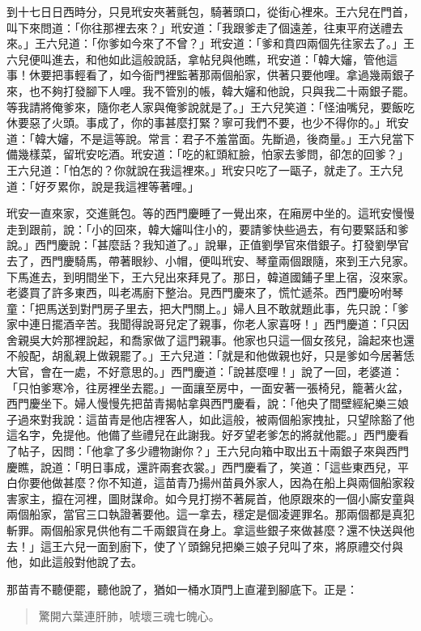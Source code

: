 到十七日日西時分，只見玳安夾著氈包，騎著頭口，從街心裡來。王六兒在門首，叫下來問道：「你往那裡去來？」玳安道：「我跟爹走了個遠差，往東平府送禮去來。」王六兒道：「你爹如今來了不曾？」玳安道：「爹和賁四兩個先往家去了。」王六兒便叫進去，和他如此這般說話，拿帖兒與他瞧，玳安道：「韓大嬸，管他這事！休要把事輕看了，如今衙門裡監著那兩個船家，供著只要他哩。拿過幾兩銀子來，也不夠打發腳下人哩。我不管別的帳，韓大嬸和他說，只與我二十兩銀子罷。等我請將俺爹來，隨你老人家與俺爹說就是了。」王六兒笑道：「怪油嘴兒，要飯吃休要惡了火頭。事成了，你的事甚麼打緊？寧可我們不要，也少不得你的。」玳安道：「韓大嬸，不是這等說。常言：君子不羞當面。先斷過，後商量。」王六兒當下備幾樣菜，留玳安吃酒。玳安道：「吃的紅頭紅臉，怕家去爹問，卻怎的回爹？」王六兒道：「怕怎的？你就說在我這裡來。」玳安只吃了一甌子，就走了。王六兒道：「好歹累你，說是我這裡等著哩。」

玳安一直來家，交進氈包。等的西門慶睡了一覺出來，在廂房中坐的。這玳安慢慢走到跟前，說：「小的回來，韓大嬸叫住小的，要請爹快些過去，有句要緊話和爹說。」西門慶說：「甚麼話？我知道了。」說畢，正值劉學官來借銀子。打發劉學官去了，西門慶騎馬，帶著眼紗、小帽，便叫玳安、琴童兩個跟隨，來到王六兒家。下馬進去，到明間坐下，王六兒出來拜見了。那日，韓道國鋪子里上宿，沒來家。老婆買了許多東西，叫老馮廚下整治。見西門慶來了，慌忙遞茶。西門慶吩咐琴童：「把馬送到對門房子里去，把大門關上。」婦人且不敢就題此事，先只說：「爹家中連日擺酒辛苦。我聞得說哥兒定了親事，你老人家喜呀！」西門慶道：「只因舍親吳大妗那裡說起，和喬家做了這門親事。他家也只這一個女孩兒，論起來也還不般配，胡亂親上做親罷了。」王六兒道：「就是和他做親也好，只是爹如今居著恁大官，會在一處，不好意思的。」西門慶道：「說甚麼哩！」說了一回，老婆道：「只怕爹寒冷，往房裡坐去罷。」一面讓至房中，一面安著一張椅兒，籠著火盆，西門慶坐下。婦人慢慢先把苗青揭帖拿與西門慶看，說：「他央了間壁經紀樂三娘子過來對我說：這苗青是他店裡客人，如此這般，被兩個船家拽扯，只望除豁了他這名字，免提他。他備了些禮兒在此謝我。好歹望老爹怎的將就他罷。」西門慶看了帖子，因問：「他拿了多少禮物謝你？」王六兒向箱中取出五十兩銀子來與西門慶瞧，說道：「明日事成，還許兩套衣裳。」西門慶看了，笑道：「這些東西兒，平白你要他做甚麼？你不知道，這苗青乃揚州苗員外家人，因為在船上與兩個船家殺害家主，攛在河裡，圖財謀命。如今見打撈不著屍首，他原跟來的一個小廝安童與兩個船家，當官三口執證著要他。這一拿去，穩定是個凌遲罪名。那兩個都是真犯斬罪。兩個船家見供他有二千兩銀貨在身上。拿這些銀子來做甚麼？還不快送與他去！」這王六兒一面到廚下，使了丫頭錦兒把樂三娘子兒叫了來，將原禮交付與他，如此這般對他說了去。

那苗青不聽便罷，聽他說了，猶如一桶水頂門上直灌到腳底下。正是：
\begin{quote}
驚開六葉連肝肺，唬壞三魂七魄心。
\end{quote}


